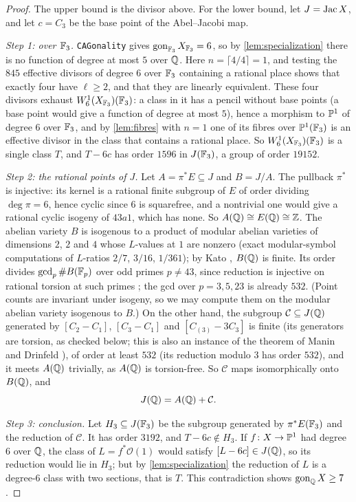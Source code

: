 \begin{proof}
The upper bound is the divisor above. For the lower bound, let $J=\operatorname{Jac} X$, and let $c=C_3$ be the base point of
the Abel--Jacobi map.

\emph{Step 1: over $\mathbb{F}_3$.} \texttt{CAGonality} gives $\operatorname{gon}_{\mathbb{F}_3}X_{\mathbb{F}_3}=6$, so by \cref{lem:specialization}
there is no function of degree at most $5$ over $\mathbb{Q}$. Here $n=\lceil 4/4\rceil=1$, and testing the $845$
effective divisors of degree $6$ over $\mathbb{F}_3$ containing a rational place shows that exactly four have
$\ell\ge2$, and that they are linearly equivalent. These four divisors exhaust $W^1_6(X_{\mathbb{F}_3})(\mathbb{F}_3)$: a class in it
has a pencil without base points (a base point would give a function of degree at most $5$), hence a morphism to
$\mathbb{P}^1$ of degree $6$ over $\mathbb{F}_3$, and by \cref{lem:fibres} with $n=1$ one of its fibres over $\mathbb{P}^1(\mathbb{F}_3)$ is an
effective divisor in the class that contains a rational place. So $W^1_6(X_{\mathbb{F}_3})(\mathbb{F}_3)$ is a single class $T$, and
$T-6c$ has order $1596$ in $J(\mathbb{F}_3)$, a group of order $19152$.

\emph{Step 2: the rational points of $J$.} Let $A=\pi^*E\subseteq J$ and $B=J/A$. The pullback $\pi^*$ is
injective: its kernel is a rational finite subgroup of $E$ of order dividing $\deg\pi=6$, hence cyclic since $6$ is
squarefree, and a nontrivial one would give a rational cyclic isogeny of $43a1$, which has none. So $A(\mathbb{Q})\cong E(\mathbb{Q})\cong\mathbb{Z}$. The
abelian variety $B$ is isogenous to a product of modular abelian varieties of dimensions $2$, $2$ and $4$
whose $L$-values at $1$ are nonzero (exact modular-symbol computations of $L$-ratios $2/7$, $3/16$,
$1/361$); by Kato \cite[Corollary~14.3]{Kato2004}, $B(\mathbb{Q})$ is finite. Its order divides
$\gcd_{p}\#B(\mathbb{F}_p)$ over odd primes $p\ne43$, since reduction is injective on rational torsion at such
primes \cite[Appendix]{Katz1981}; the gcd over $p=3,5,23$ is already $532$. (Point counts are invariant under
isogeny, so we may compute them on the modular abelian variety isogenous to $B$.)
On the other hand, the subgroup $\mathcal C\subseteq J(\mathbb{Q})$ generated by $[C_2-C_1]$, $[C_3-C_1]$ and
$[C_{(3)}-3C_3]$ is finite (its generators are torsion, as checked below; this is also an instance of the theorem of
Manin and Drinfeld \cite{Manin1972,Drinfeld1973}), of order at least $532$ (its reduction modulo $3$ has order
$532$), and it meets $A(\mathbb{Q})$ trivially, as $A(\mathbb{Q})$ is torsion-free. So $\mathcal C$ maps isomorphically
onto $B(\mathbb{Q})$, and
\[
 J(\mathbb{Q})=A(\mathbb{Q})+\mathcal C.
\]

\emph{Step 3: conclusion.} Let $H_3\subseteq J(\mathbb{F}_3)$ be the subgroup generated by $\pi^*E(\mathbb{F}_3)$ and the
reduction of $\mathcal C$. It has order $3192$, and $T-6c\notin H_3$. If $f\colon X\to\mathbb{P}^1$ had degree $6$
over $\mathbb{Q}$, the class of $L=f^*\mathcal O(1)$ would satisfy $[L-6c]\in J(\mathbb{Q})$, so its reduction would lie in
$H_3$; but by \cref{lem:specialization} the reduction of $L$ is a degree-$6$ class with two sections, that is
$T$. This contradiction shows $\operatorname{gon}_{\mathbb{Q}} X\ge7$.
\end{proof}

